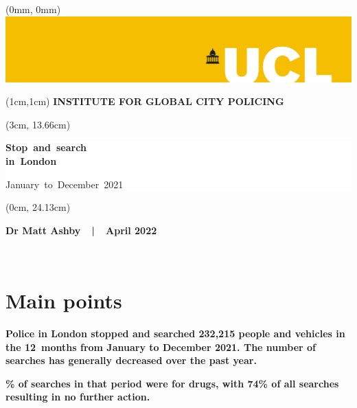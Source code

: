 \documentclass[
  a4paper,
  twoside, 11pt]{article}
\begin{document}
\begin{textblock*}{21cm}(0mm, 0mm)
\includegraphics[width=21cm]{../ucl-banner-port-yellow-rgb-lg.png}
\end{textblock*}

\begin{textblock*}{21cm}(1cm,1cm)
\textbf{\sffamily INSTITUTE FOR GLOBAL CITY POLICING}
\end{textblock*}

\begin{textblock*}{18cm}(3cm, 13.66cm)
\raggedright \sffamily
\begin{singlespace}
\colorbox{white}{\hspace{1cm}\parbox[c][5.9cm]{16cm}{
{\fontsize{40}{32}\selectfont \bfseries \mbox{Stop and search}\\\mbox{in London}
\vspace{6pt}}

{\fontsize{32}{26}\selectfont \mbox{January to December 2021} }

}\hspace{1cm}}
\end{singlespace}
\end{textblock*}

\begin{textblock*}{11.43cm}(0cm, 24.13cm)
\colorbox{uclyellow}{\parbox[c][2.63cm]{\textwidth}{
\centering \bfseries \sffamily \fontsize{16}{16}\selectfont 
Dr Matt Ashby\ \ |\ \ April 2022
}}
\end{textblock*}

~

\thispagestyle{empty}
\newpage

\hypertarget{main-points}{%
\section{Main points}\label{main-points}}

\textbf{\sffamily Police in London stopped and searched 232,215 people and vehicles in the 12~months from January to December 2021. The number of searches has generally decreased over the past year.}

\textbf{\% of searches in that period were for drugs, with 74\% of all searches resulting in no further action.}
\end{document}
